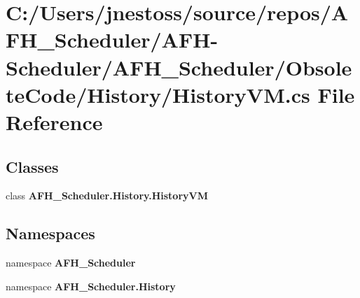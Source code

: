 \section{C\+:/\+Users/jnestoss/source/repos/\+A\+F\+H\+\_\+\+Scheduler/\+A\+F\+H-\/\+Scheduler/\+A\+F\+H\+\_\+\+Scheduler/\+Obsolete\+Code/\+History/\+History\+VM.cs File Reference}
\label{_history_v_m_8cs}
\subsection*{Classes}
\begin{DoxyCompactItemize}
\item 
class \textbf{ A\+F\+H\+\_\+\+Scheduler.\+History.\+History\+VM}
\end{DoxyCompactItemize}
\subsection*{Namespaces}
\begin{DoxyCompactItemize}
\item 
namespace \textbf{ A\+F\+H\+\_\+\+Scheduler}
\item 
namespace \textbf{ A\+F\+H\+\_\+\+Scheduler.\+History}
\end{DoxyCompactItemize}
